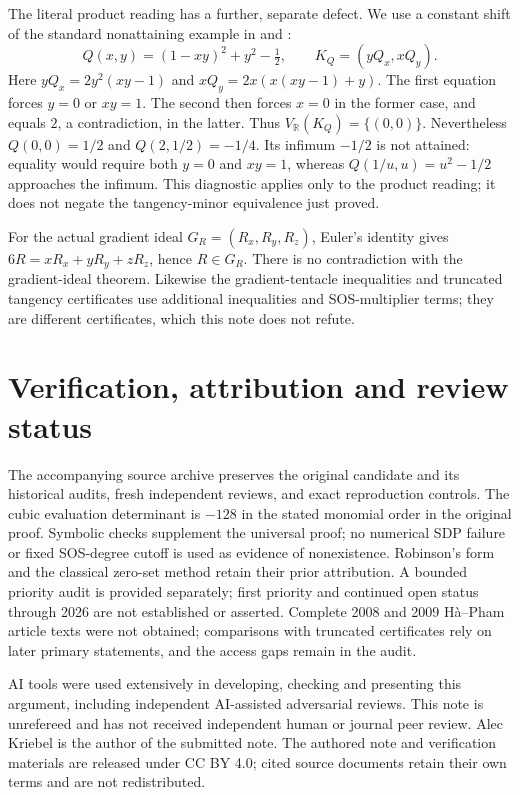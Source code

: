 \documentclass[11pt]{article}
\begin{document}
The literal product reading has a further, separate defect. We use a constant
shift of the standard nonattaining example in
\cite[Section~1.6, equation~(6)]{tentacles} and \cite[p.~810]{report}:
\[
 Q(x,y)=(1-xy)^2+y^2-\tfrac12,\qquad K_Q=(yQ_x,xQ_y).
\]
Here $yQ_x=2y^2(xy-1)$ and $xQ_y=2x(x(xy-1)+y)$. The first equation forces
$y=0$ or $xy=1$. The second then forces $x=0$ in the former case, and equals
$2$, a contradiction, in the latter. Thus $V_{\mathbb R}(K_Q)=\{(0,0)\}$.
Nevertheless $Q(0,0)=1/2$ and $Q(2,1/2)=-1/4$. Its infimum $-1/2$ is not
attained: equality would require both $y=0$ and $xy=1$, whereas
$Q(1/u,u)=u^2-1/2$ approaches the infimum. This diagnostic applies only to the
product reading; it does not negate the tangency-minor equivalence just proved.

For the actual gradient ideal $G_R=(R_x,R_y,R_z)$, Euler's identity gives
$6R=xR_x+yR_y+zR_z$, hence $R\in G_R$. There is no contradiction with the
gradient-ideal theorem. Likewise the gradient-tentacle inequalities
\cite{tentacles} and truncated tangency certificates
\cite{truncated,gcv} use additional inequalities and SOS-multiplier terms;
they are different certificates, which this note does not refute.

\section*{Verification, attribution and review status}
The accompanying source archive preserves the original candidate and its
historical audits, fresh independent reviews, and exact reproduction controls.
The cubic evaluation determinant is $-128$ in the stated monomial order in
the original proof. Symbolic checks supplement the universal proof; no numerical
SDP failure or fixed SOS-degree cutoff is used as evidence of nonexistence.
Robinson's form and the classical zero-set method retain their prior attribution.
A bounded priority audit is provided separately; first priority and continued
open status through 2026 are not established or asserted. Complete 2008 and
2009 H\`a--Pham article texts were not obtained; comparisons with truncated
certificates rely on later primary statements, and the access gaps remain in
the audit.

AI tools were used extensively in developing, checking and presenting this
argument, including independent AI-assisted adversarial reviews. This note is
unrefereed and has not received independent human or journal peer review.
Alec Kriebel is the author of the submitted note. The authored note and
verification materials are released under CC BY 4.0; cited source documents
retain their own terms and are not redistributed.
\end{document}
